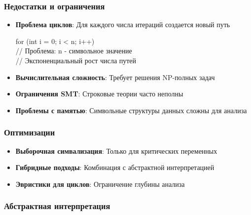 \subsubsection{Недостатки и ограничения}
\begin{itemize}
    \item \textbf{Проблема циклов}: Для каждого числа итераций создается новый путь
    \begin{codebox}
    for (int i = 0; i < n; i++)\\
    // Проблема: n - символьное значение\\
    // Экспоненциальный рост числа путей
    \end{codebox}
    
    \item \textbf{Вычислительная сложность}: Требует решения NP-полных задач
    \item \textbf{Ограничения SMT}: Строковые теории часто неполны \cite{SMTStrings}
    
    \item \textbf{Проблемы с памятью}: Символьные структуры данных сложны для анализа
\end{itemize}

\subsubsection{Оптимизации}
\begin{itemize}
    \item \textbf{Выборочная симвализация}: Только для критических переменных
    \item \textbf{Гибридные подходы}: Комбинация с абстрактной интерпретацией
    \item \textbf{Эвристики для циклов}: Ограничение глубины анализа
\end{itemize}

\newpage


\subsubsection{Абстрактная интерпретация}

\newpage


